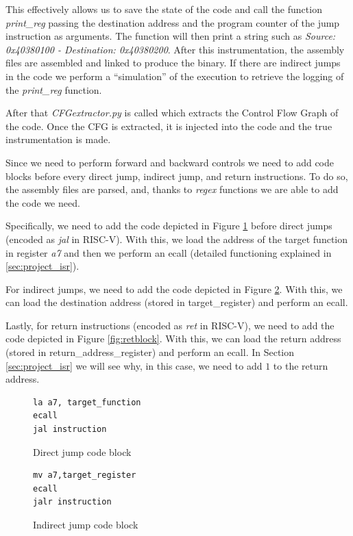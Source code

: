 This effectively allows us to save the state of the code and call the function
\textit{print\_reg} passing the destination address and the program counter of the
jump instruction as arguments. The function will then print a string such as
\textit{Source: 0x40380100 - Destination: 0x40380200}. After this
instrumentation, the assembly files are assembled and linked to produce the binary.
If there are indirect jumps in the code we perform a ``simulation'' of the
execution to retrieve the logging of the \textit{print\_reg} function.

After that \textit{CFGextractor.py} is called which extracts the Control Flow
Graph of the code. Once the CFG is extracted, it is injected into the code and
the true instrumentation is made.

Since we need to perform forward and backward controls we need to add code
blocks before every direct jump, indirect jump, and return instructions. To do so,
the assembly files are parsed, and, thanks to \textit{regex} functions we are able
to add the code we need.

Specifically, we need to add the code depicted in Figure \ref{fig:dirjumpblock}
before direct jumps (encoded as \textit{jal} in RISC-V). With this, we load the address
of the target function in register \textit{a7} and then we perform an ecall (detailed
functioning explained in \ref{sec:project_isr}).

For indirect jumps, we need to add the code depicted in Figure \ref{fig:indirjumpblock}.
With this, we can load the destination address (stored in target\_register) and perform
an ecall.

Lastly, for return instructions (encoded as \textit{ret} in RISC-V), we need to
add the code depicted in Figure \ref{fig:retblock}. With this, we can load the
return address (stored in return\_address\_register) and perform an ecall. In Section
\ref{sec:project_isr} we will see why, in this case, we need to add $1$ to the return
address.

\begin{figure}[htbp]
  \centering
  \begin{lstlisting}
la a7, target_function
ecall
jal instruction
 \end{lstlisting}
  \caption{Direct jump code block}
  \label{fig:dirjumpblock}
\end{figure}

\begin{figure}[htbp]
  \centering
  \begin{lstlisting}
mv a7,target_register
ecall
jalr instruction
 \end{lstlisting}
  \caption{Indirect jump code block}
  \label{fig:indirjumpblock}
\end{figure}

